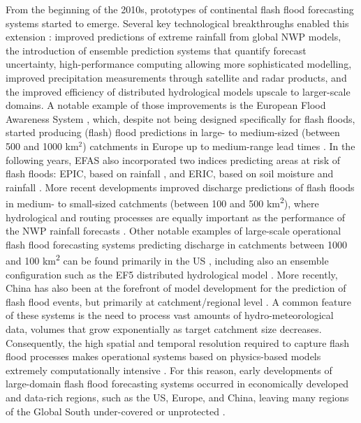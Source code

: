 From  the beginning of the 2010s, prototypes of continental flash flood forecasting systems started to emerge. Several key technological breakthroughs enabled this extension \citep{Philipp_2016, Zanchetta_2020}: improved predictions of extreme rainfall from global NWP models, the introduction of ensemble prediction systems that quantify forecast uncertainty, high-performance computing allowing more sophisticated modelling, improved precipitation measurements through satellite and radar products, and the improved efficiency of distributed hydrological models upscale to larger-scale domains. A notable example of those improvements is the European Flood Awareness System \citep{Thielen_2009}, which, despite not being designed specifically for flash floods, started producing (flash) flood predictions in large- to medium-sized (between 500 and 1000 km$^2$) catchments in Europe up to medium-range lead times \citep{Bartholmes_2009}. In the following years, EFAS also incorporated two indices predicting areas at risk of flash floods: EPIC, based on rainfall \citep{Alfieri_2015a}, and ERIC, based on soil moisture and rainfall \citep{Raynaud_2015}. More recent developments improved discharge predictions of flash floods in medium- to small-sized catchments (between 100 and 500 km\textsuperscript{2}), where hydrological and routing processes are equally important as the performance of the NWP rainfall forecasts \citep{Mazzetti_2021}. Other notable examples of large-scale operational flash flood forecasting systems predicting discharge in catchments between 1000 and 100 km\textsuperscript{2} can be found primarily in the US \citep{Clark_2014, Gourley_2017, Georgakakos_2022}, including also an ensemble configuration such as the EF5 distributed hydrological model \citep{Flamig_2020}. More recently, China has also been at the forefront of model development for the prediction of flash flood events, but primarily at catchment/regional level \citep{Liu_2018}. A common feature of these systems is the need to process vast amounts of hydro-meteorological data, volumes that grow exponentially as target catchment size decreases. Consequently, the high spatial and temporal resolution required to capture flash flood processes makes operational systems based on physics-based models extremely computationally intensive \citep{Efstratiadis_2010}. For this reason, early developments of large-domain flash flood forecasting systems occurred in economically developed and data-rich regions, such as the US, Europe, and China, leaving many regions of the Global South under-covered or unprotected \citep{Nearing_2021}. 

